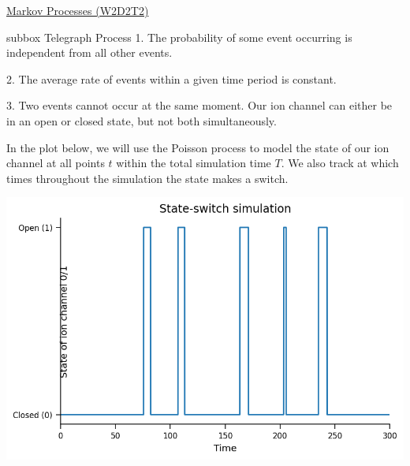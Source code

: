 \begin{textbox}{\href{https://colab.research.google.com/github/NeuromatchAcademy/course-content/blob/master/tutorials/W2D2_LinearSystems/student/W2D2_Tutorial2.ipynb}{Markov Processes (W2D2T2)}   }
\begin{subbox}{subbox}{ Telegraph Process}
1. The probability of some event occurring is independent from all other events.

2. The average rate of events within a given time period is constant.

3. Two events cannot occur at the same moment. Our ion channel can either be in an open or closed state, but not both simultaneously. 

In the plot below, we will use the Poisson process to model the state of our ion channel at all points $t$ within the total simulation time $T$. We also track at which times throughout the simulation the state makes a switch. 

\centering
\includegraphics[scale=0.25]{Figures/LS/MC_Figure1.png}

\end{subbox}
\end{textbox}
